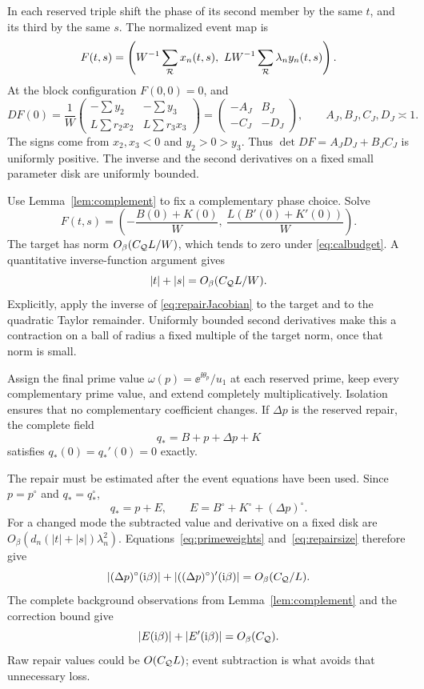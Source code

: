 In each reserved triple shift the phase of its second member by the
same \(t\), and its third by the same \(s\). The normalized event map is
\[
 F(t,s)=\left(W^{-1}\sum_{\mathcal R}x_n(t,s),\
                   LW^{-1}\sum_{\mathcal R}\lambda_n y_n(t,s)\right).
\]
At the block configuration \(F(0,0)=0\), and
\begin{equation}\label{eq:repairJacobian}
 DF(0)=
 \frac1W\begin{pmatrix}
 -\sum y_2&-\sum y_3\\
 L\sum r_2x_2&L\sum r_3x_3
 \end{pmatrix}
 =\begin{pmatrix}-A_J&B_J\\-C_J&-D_J\end{pmatrix},
 \qquad A_J,B_J,C_J,D_J\asymp1.
\end{equation}
The signs come from \(x_2,x_3<0\) and \(y_2>0>y_3\).
Thus \(\det DF=A_JD_J+B_JC_J\) is uniformly positive.
The inverse and the second derivatives on a fixed small parameter disk
are uniformly bounded.

Use Lemma~\ref{lem:complement} to fix a complementary phase choice.
Solve
\begin{equation}\label{eq:repairtarget}
 F(t,s)=\left(-\frac{B(0)+K(0)}W,\
                    \frac{L(B'(0)+K'(0))}W\right).
\end{equation}
The target has norm \(O_\beta(C_{\mathcal Q}L/W)\), which tends to zero under
\eqref{eq:calbudget}. A quantitative inverse-function argument gives
\begin{equation}\label{eq:repairsize}
 |t|+|s|=O_\beta(C_{\mathcal Q}L/W).
\end{equation}
Explicitly, apply the inverse of \eqref{eq:repairJacobian} to the
target and to the quadratic Taylor remainder. Uniformly bounded
second derivatives make this a contraction on a ball of radius a
fixed multiple of the target norm, once that norm is small.

Assign the final prime value \(\omega(p)=\ee^{\ii\theta_p}/u_1\)
at each reserved prime, keep every complementary prime value, and
extend completely multiplicatively. Isolation ensures that no
complementary coefficient changes. If \(\Delta p\) is the reserved
repair, the complete field
\[
 q_*=B+p+\Delta p+K
\]
satisfies \(q_*(0)=q_*'(0)=0\) exactly.

The repair must be estimated after the event equations have been used.
Since \(p=p^\circ\) and \(q_*=q_*^\circ\),
\[
 q_*=p+E,\qquad E=B^\circ+K^\circ+(\Delta p)^\circ.
\]
For a changed mode the subtracted value and derivative on a fixed disk
are \(O_\beta(d_n(|t|+|s|)\lambda_n^2)\).
Equations~\eqref{eq:primeweights} and~\eqref{eq:repairsize} therefore give
\[
 |(\Delta p)^\circ(\mathrm i\beta)|
       +|((\Delta p)^\circ)'(\mathrm i\beta)|
       =O_\beta(C_{\mathcal Q}/L).
\]
The complete background observations from Lemma~\ref{lem:complement}
and the correction bound give
\begin{equation}\label{eq:Ebound}
 |E(\mathrm i\beta)|+|E'(\mathrm i\beta)|=O_\beta(C_{\mathcal Q}).
\end{equation}
Raw repair values could be \(O(C_{\mathcal Q}L)\); event subtraction is what
avoids that unnecessary loss.

